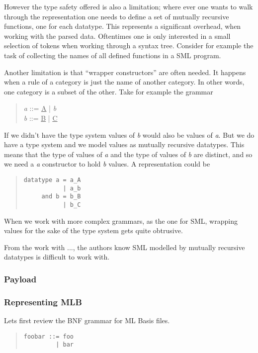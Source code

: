 However the type safety offered is also a limitation; where ever one wants to
walk through the representation one needs to define a set of mutually recursive
functions, one for each datatype. This represents a significant overhead, when
working with the parsed data. Oftentimes one is only interested in a small
selection of tokens when working through a syntax tree. Consider for example the
task of collecting the names of all defined functions in a SML program.

Another limitation is that ``wrapper constructors'' are often needed. It happens
when a rule of a category is just the name of another category. In other words,
one category is a subset of the other. Take for example the grammar
\begin{quote}
\textit{a} ::= \underline{A} | \textit{b}\\
\textit{b} ::= \underline{B} | \underline{C}
\end{quote}
If we didn't have the type system values of \textit{b} would also be values of
\textit{a}. But we do have a type system and we model values as mutually
recursive datatypes. This means that the type of values of \textit{a} and the
type of values of \textit{b} are distinct, and so we need a \textit{a}
constructor to hold \textit{b} values. A representation could be
\begin{quote}
\begin{verbatim}
datatype a = a_A
           | a_b
     and b = b_B
           | b_C
\end{verbatim}
\end{quote}

When we work with more complex grammars, as the one for SML, wrapping values for
the sake of the type system gets quite obtrusive.

From the work with ..., the authors know SML
modelled by mutually recursive datatypes is difficult to work with.


\subsubsection{Payload}


\subsubsection{Representing MLB}
Lets first review the BNF grammar for ML Basis files.
\begin{quote}
\begin{verbatim}
foobar ::= foo
         | bar
\end{verbatim}
\end{quote}

